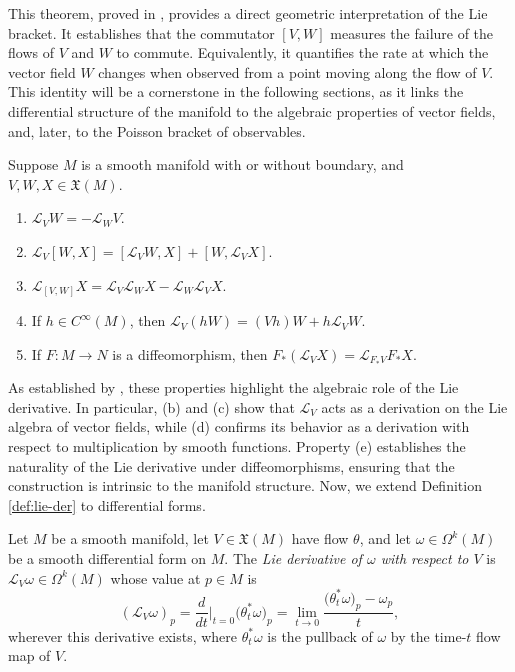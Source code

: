 This theorem, proved in \cite[Theorem 9.38]{leeIntroductionSmoothManifolds2013}, provides a direct geometric interpretation of the Lie bracket. It establishes that the commutator $[V,W]$ measures the failure of the flows of $V$ and $W$ to commute. Equivalently, it quantifies the rate at which the vector field $W$ changes when observed from a point moving along the flow of $V$. This identity will be a cornerstone in the following sections, as it links the differential structure of the manifold to the algebraic properties of vector fields, and, later, to the Poisson bracket of observables.

\begin{corollary}
	Suppose $M$ is a smooth manifold with or without boundary, and $V, W, X \in \mathfrak{X}(M)$. 
	\begin{enumerate}
		\item[(a)] $\mathscr{L}_VW = -\mathscr{L}_WV$.
		\item[(b)] $\mathscr{L}_V[W,X] = [\mathscr{L}_VW,X] + [W,\mathscr{L}_VX]$.
		\item[(c)] $\mathscr{L}_{[V,W]}X = \mathscr{L}_V\mathscr{L}_WX - \mathscr{L}_W\mathscr{L}_VX$.
		\item[(d)] If $h \in C^\infty(M)$, then $\mathscr{L}_V(hW) = (Vh)W + h\mathscr{L}_VW$.
		\item[(e)] If $F : M \to N$ is a diffeomorphism, then $F_*(\mathscr{L}_VX) = \mathscr{L}_{F_*V}F_*X$.
	\end{enumerate}
\end{corollary}

As established by \cite[Corollary 9.39]{leeIntroductionSmoothManifolds2013}, these properties highlight the algebraic role of the Lie derivative. In particular, (b) and (c) show that $\mathscr{L}_V$ acts as a derivation on the Lie algebra of vector fields, while (d) confirms its behavior as a derivation with respect to multiplication by smooth functions. Property (e) establishes the naturality of the Lie derivative under diffeomorphisms, ensuring that the construction is intrinsic to the manifold structure. 
Now, we extend Definition \ref{def:lie-der} to differential forms.

\begin{definition}
	Let $M$ be a smooth manifold, let $V \in \mathfrak{X}(M)$ have flow $\theta$, and let $\omega \in \Omega^k(M)$ be a smooth differential form on $M$. The \emph{Lie derivative of $\omega$ with respect to $V$} is $\mathscr{L}_V\omega \in \Omega^k(M)$ whose value at $p \in M$ is
	\[
	(\mathscr{L}_V\omega)_p = \frac{d}{dt}\Big|_{t=0} \big(\theta_t^*\omega\big)_p = \lim_{t\to 0} \frac{\big(\theta_t^*\omega\big)_p - \omega_p}{t},
	\]
	wherever this derivative exists, where $\theta_t^*\omega$ is the pullback of $\omega$ by the time-$t$ flow map of $V$.
\end{definition}

